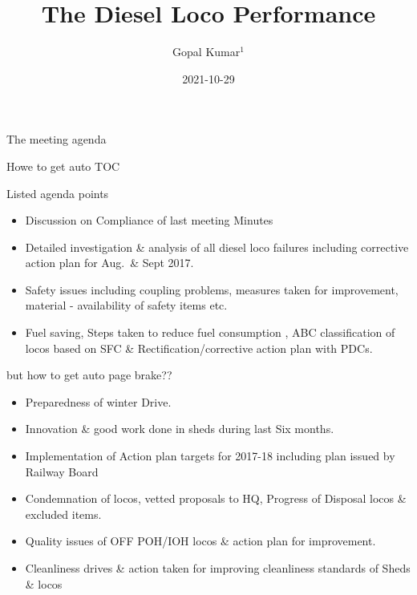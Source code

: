 \documentclass[
  ignorenonframetext,
]{beamer}
\title{The Diesel Loco Performance}
\author{Gopal Kumar\(^1\)}
\date{2021-10-29}
\institute{\(^1\)CMPE(Diesel)}
\providecommand{\tightlist}{%
  \setlength{\itemsep}{0pt}\setlength{\parskip}{0pt}}
\begin{document}
\frame{\titlepage}

\begin{frame}[allowframebreaks]
  \tableofcontents[hideallsubsections]
\end{frame}
\begin{frame}
\end{frame}

\begin{frame}{The meeting agenda}
\protect\hypertarget{the-meeting-agenda}{}
\begin{block}{Howe to get auto TOC}
\protect\hypertarget{howe-to-get-auto-toc}{}
\end{block}
\end{frame}

\begin{frame}{Listed agenda points}
\protect\hypertarget{listed-agenda-points}{}
\begin{itemize}[<+->]
\tightlist
\item
  Discussion on Compliance of last meeting Minutes
\item
  Detailed investigation \& analysis of all diesel loco failures
  including corrective action plan for Aug.~\& Sept 2017.
\item
  Safety issues including coupling problems, measures taken for
  improvement, material - availability of safety items etc.
\item
  Fuel saving, Steps taken to reduce fuel consumption , ABC
  classification of locos based on SFC \& Rectification/corrective
  action plan with PDCs.
\end{itemize}
\end{frame}

\begin{frame}{but how to get auto page brake??}
\protect\hypertarget{but-how-to-get-auto-page-brake}{}
\begin{itemize}[<+->]
\tightlist
\item
  Preparedness of winter Drive.
\item
  Innovation \& good work done in sheds during last Six months.
\item
  Implementation of Action plan targets for 2017-18 including plan
  issued by Railway Board
\item
  Condemnation of locos, vetted proposals to HQ, Progress of Disposal
  locos \& excluded items.
\item
  Quality issues of OFF POH/IOH locos \& action plan for improvement.
\item
  Cleanliness drives \& action taken for improving cleanliness standards
  of Sheds \& locos
\end{itemize}
\end{frame}
\end{document}
